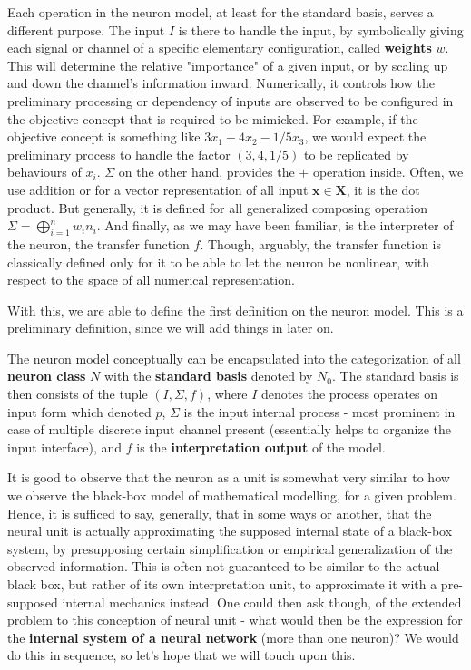 Each operation in the neuron model, at least for the standard basis, serves a different purpose. The input $I$ is there to handle the input, by symbolically giving each signal or channel of a specific elementary configuration, called \textbf{weights} $w$. This will determine the relative "importance" of a given input, or by scaling up and down the channel's information inward. Numerically, it controls how the preliminary processing or dependency of inputs are observed to be configured in the objective concept that is required to be mimicked. For example, if the objective concept is something like $3x_1 + 4x_2 - 1/5 x_3$, we would expect the preliminary process to handle the factor $(3,4,1/5)$ to be replicated by behaviours of $x_i$. $\Sigma$ on the other hand, provides the $+$ operation inside. Often, we use addition or for a vector representation of all input $\mathbf{x}\in \mathbf{X}$, it is the dot product. But generally, it is defined for all generalized composing operation $\Sigma= \bigoplus_{i=1}^{n}w_i n_i$. And finally, as we may have been familiar, is the interpreter of the neuron, the transfer function $f$. Though, arguably, the transfer function is classically defined only for it to be able to let the neuron be nonlinear, with respect to the space of all numerical representation. 

With this, we are able to define the first definition on the neuron model. This is a preliminary definition, since we will add things in later on.

\begin{definition}
    The neuron model conceptually can be encapsulated into the categorization of all \textbf{neuron class} $N$ with the \textbf{standard basis} denoted by $N_{0}$. The standard basis is then consists of the tuple $(I,\Sigma, f)$, where $I$ denotes the process operates on input form which denoted $p$, $\Sigma$ is the input internal process - most prominent in case of multiple discrete input channel present (essentially helps to organize the input interface), and $f$ is the \textbf{interpretation output} of the model. 
\end{definition}

It is good to observe that the neuron as a unit is somewhat very similar to how we observe the black-box model of mathematical modelling, for a given problem. Hence, it is sufficed to say, generally, that in some ways or another, that the neural unit is actually approximating the supposed internal state of a black-box system, by presupposing certain simplification or empirical generalization of the observed information. This is often not guaranteed to be similar to the actual black box, but rather of its own interpretation unit, to approximate it with a pre-supposed internal mechanics instead. One could then ask though, of the extended problem to this conception of neural unit - what would then be the expression for the \textbf{internal system of a neural network} (more than one neuron)? We would do this in sequence, so let's hope that we will touch upon this. 

